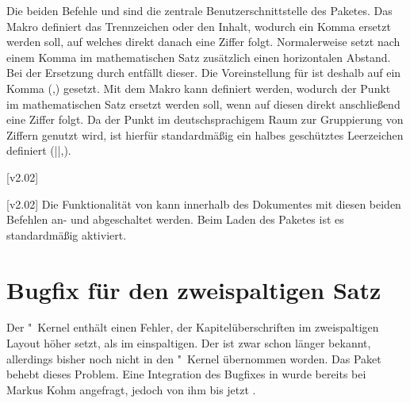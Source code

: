 \begin{DeclareEntity}{}
\begin{Declaration}
  {}
\begin{Declaration}
  {}
\printdeclarationlist
%
Die beiden Befehle  und  sind die zentrale 
Benutzerschnittstelle des Paketes. Das Makro  definiert das 
Trennzeichen oder den Inhalt, wodurch ein Komma ersetzt werden soll, auf 
welches direkt danach eine Ziffer folgt. Normalerweise setzt 
nach einem Komma im mathematischen Satz zusätzlich einen horizontalen Abstand.
Bei der Ersetzung durch  entfällt dieser. Die Voreinstellung
für  ist deshalb auf ein Komma (,) gesetzt. Mit dem Makro 
 kann definiert werden, wodurch der Punkt im mathematischen 
Satz ersetzt werden soll, wenn auf diesen direkt anschließend eine Ziffer 
folgt. Da der Punkt im deutschsprachigem Raum zur Gruppierung von Ziffern 
genutzt wird, ist hierfür standardmäßig ein halbes geschütztes Leerzeichen 
definiert (\Macro||{,}).
\end{Declaration}
\end{Declaration}

\begin{Declaration}
  {}
  [v2.02]
\begin{Declaration}
  {}
  [v2.02]
\printdeclarationlist
%
%
Die Funktionalität von  kann innerhalb des Dokumentes mit 
diesen beiden Befehlen an- und abgeschaltet werden. Beim Laden des Paketes ist 
es standardmäßig aktiviert.%
\end{Declaration}
\end{Declaration}
%
%
\end{DeclareEntity}



\section[%
  Das Paket \Package{twocolfix} -- Bugfix für den zweispaltigen Satz%
]{%
  Bugfix für den zweispaltigen Satz%
}
%
\begin{DeclareEntity}{}
Der "~Kernel enthält einen Fehler, der Kapitelüberschriften im
zweispaltigen Layout höher setzt, als im einspaltigen. Der 
ist zwar schon länger bekannt, allerdings bisher noch nicht in den 
"~Kernel übernommen worden. Das Paket  behebt 
dieses Problem. Eine Integration des Bugfixes in \KOMAScript wurde bereits bei 
Markus Kohm angefragt, jedoch von ihm bis jetzt 
.
\end{DeclareEntity}



